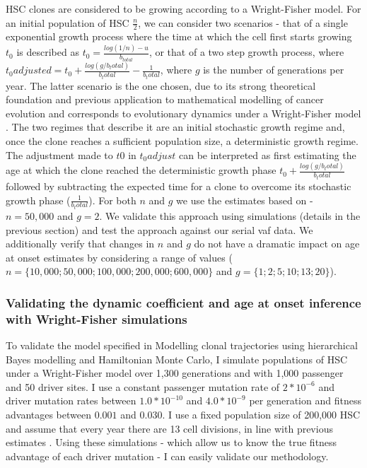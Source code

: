 HSC clones are considered to be growing according to a Wright-Fisher model. For an initial population of HSC $\frac{n}{2}$, we can consider two scenarios - that of a single exponential growth process where the time at which the cell first starts growing $t_0$ is described as $t_0 = \frac{log(1/n) - u}{b_{total}}$, or that of a two step growth process, where $t_{0}adjusted=t_0 + \frac{log(g/b_total)}{b_total}-\frac{1}{b_total}$, where $g$ is the number of generations per year. The latter scenario is the one chosen, due to its strong theoretical foundation and previous application to mathematical modelling of cancer evolution and corresponds to evolutionary dynamics under a Wright-Fisher model \cite{Beerenwinkel2015-xr}. The two regimes that describe it are an initial stochastic growth regime and, once the clone reaches a sufficient population size, a deterministic growth regime. The adjustment made to $t0$ in $t_0adjust$ can be interpreted as first estimating the age at which the clone reached the deterministic growth phase $t_0 + \frac{log(g/b_total)}{b_total}$ followed by subtracting the expected time for a clone to overcome its stochastic growth phase ($\frac{1}{b_total}$). For both $n$ and $g$ we use the estimates based on \cite{Lee-Six2018-lp} - $n=50,000$ and $g=2$. We validate this approach using simulations (details in the previous section) and test the approach against our serial \ac{vaf} data. We additionally verify that changes in $n$ and $g$ do not have a dramatic impact on age at onset estimates by considering a range of values ($n=\{10,000;50,000;100,000;200,000;600,000\}$ and $g=\{1;2;5;10;13;20\}$).

\subsubsection{Validating the dynamic coefficient and age at onset inference with Wright-Fisher simulations}

To validate the model specified in Modelling clonal trajectories using hierarchical Bayes modelling and Hamiltonian Monte Carlo, I simulate populations of HSC under a Wright-Fisher model \cite{Beerenwinkel_undated-up} over 1,300 generations and with 1,000 passenger and 50 driver sites. I use a constant passenger mutation rate of $2*10^{-6}$ and driver mutation rates between $1.0*10^{-10}$ and $4.0*10^{-9}$ per generation and fitness advantages between $0.001$ and $0.030$. I use a fixed population size of 200,000 HSC and assume that every year there are 13 cell divisions, in line with previous estimates \cite{Lee-Six2018-lp,Watson2020-pz}. Using these simulations - which allow us to know the true fitness advantage of each driver mutation - I can easily validate our methodology.

